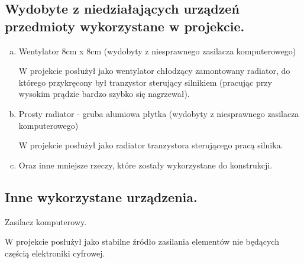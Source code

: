\documentclass[a4paper,oneside,11pt]{report}
\begin{document}
\subsection{Wydobyte z niedziałających urządzeń przedmioty wykorzystane w projekcie.}
\begin{enumerate}[a)]
\item Wentylator 8cm x 8cm (wydobyty z niesprawnego zasilacza komputerowego)

W projekcie posłużył jako wentylator chłodzący zamontowany radiator, do którego przykręcony był tranzystor sterujący silnikiem (pracując przy wysokim prądzie bardzo szybko się nagrzewał).
\item Prosty radiator - gruba alumiowa płytka (wydobyty z niesprawnego zasilacza komputerowego)

W projekcie posłużył jako radiator tranzystora sterującego pracą silnika.
\item Oraz inne mniejsze rzeczy, które zostały wykorzystane do konstrukcji.

\end{enumerate}
\subsection{Inne wykorzystane urządzenia.}
\item Zasilacz komputerowy.

W projekcie posłużył jako stabilne źródło zasilania elementów nie będących częścią elektroniki cyfrowej.
\begin{enumerate}[a)]
\end{enumerate}
\end{document}
